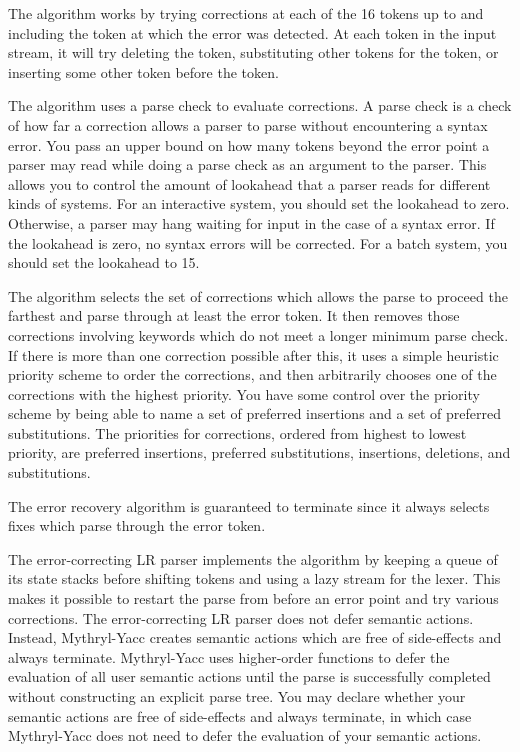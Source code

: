 The algorithm works by trying corrections at each
of the 16 tokens up to and including the token at which the
error was detected.  At each token in the input stream, it
will try deleting the token, substituting other tokens for the
token, or inserting some other token before the token.

The algorithm uses a parse check to evaluate corrections.  A parse
check is a check of how far a correction allows a parser to
parse without encountering a syntax error.
You pass an upper bound on how many tokens beyond the error
point a parser may read while doing a parse check as an argument to the
parser.  This allows
you to control the amount of lookahead that a parser reads
for different kinds of systems.  For an interactive system, you
should set the lookahead to zero.  Otherwise, a parser may hang
waiting for input in the case of a syntax error.  If the lookahead
is zero, no syntax errors will be corrected.  For a batch system,
you should set the lookahead to 15.

The algorithm selects the set of corrections which allows the parse
to proceed the farthest
and parse through at least the error token.  It then removes those
corrections involving keywords which do not meet a longer minimum
parse check.  If there is more than one correction possible after this,
it uses a simple heuristic priority scheme to order the corrections,
and then arbitrarily chooses one of the corrections with the highest priority.
You have some control over the priority scheme by being able to
name a set of preferred insertions and a set of preferred substitutions.
The priorities for corrections, ordered from highest to lowest
priority, are
preferred insertions, preferred substitutions, insertions, deletions,
and substitutions.

The error recovery algorithm is guaranteed to terminate since it always
selects fixes which parse through the
error token.

The error-correcting LR parser implements the algorithm by keeping
a queue of its state stacks before shifting tokens and using
a lazy stream for the lexer.
This makes it possible to restart the
parse from before an error point and try various corrections.  The
error-correcting LR parser does not defer semantic actions.  Instead,
Mythryl-Yacc creates semantic actions which are free of side-effects
and always terminate.
Mythryl-Yacc uses higher-order functions to defer the
evaluation of all user semantic actions until the parse is successfully
completed without constructing an explicit parse tree.
You may declare whether your semantic actions are free of side-effects
and always terminate, in which case Mythryl-Yacc does not need to defer
the evaluation of your semantic actions.

